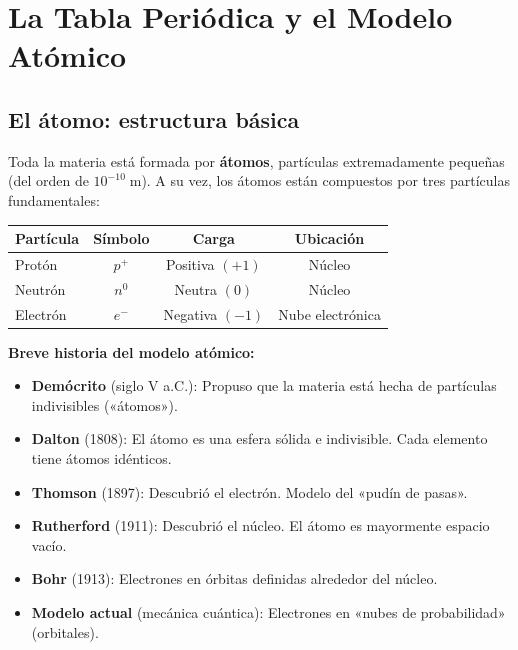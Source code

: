 \documentclass[12pt, a4paper]{article}
\begin{document}

\section{La Tabla Periódica y el Modelo Atómico}

\subsection{El átomo: estructura básica}

Toda la materia está formada por \textbf{átomos}, partículas extremadamente pequeñas (del orden de $10^{-10}\;\text{m}$). A su vez, los átomos están compuestos por tres partículas fundamentales:

\begin{cuadroteoria}
\begin{center}
\begin{tabular}{lccc}
\toprule
\textbf{Partícula} & \textbf{Símbolo} & \textbf{Carga} & \textbf{Ubicación} \\
\midrule
Protón & $p^+$ & Positiva $(+1)$ & Núcleo \\
Neutrón & $n^0$ & Neutra $(0)$ & Núcleo \\
Electrón & $e^-$ & Negativa $(-1)$ & Nube electrónica \\
\bottomrule
\end{tabular}
\end{center}
\end{cuadroteoria}

\begin{cuadroadvertencia}
\textbf{Breve historia del modelo atómico:}
\begin{itemize}[leftmargin=*]
  \item \textbf{Demócrito} (siglo V a.C.): Propuso que la materia está hecha de partículas indivisibles («átomos»).
  \item \textbf{Dalton} (1808): El átomo es una esfera sólida e indivisible. Cada elemento tiene átomos idénticos.
  \item \textbf{Thomson} (1897): Descubrió el electrón. Modelo del «pudín de pasas».
  \item \textbf{Rutherford} (1911): Descubrió el núcleo. El átomo es mayormente espacio vacío.
  \item \textbf{Bohr} (1913): Electrones en órbitas definidas alrededor del núcleo.
  \item \textbf{Modelo actual} (mecánica cuántica): Electrones en «nubes de probabilidad» (orbitales).
\end{itemize}
\end{cuadroadvertencia}
\end{document}
